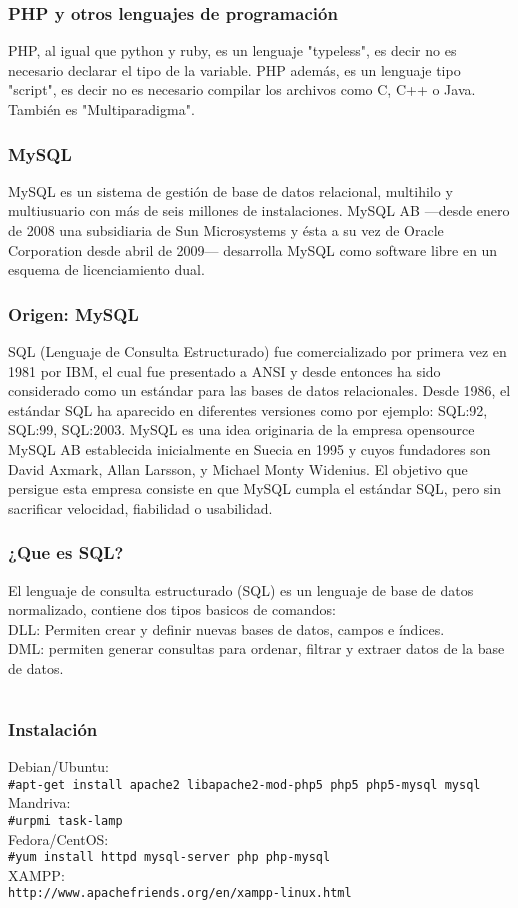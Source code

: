 \documentclass[]{beamer}
\begin{document}
\begin{frame}\frametitle{PHP y otros lenguajes de programación}
PHP, al igual que python y ruby, es un lenguaje "typeless", es decir no es necesario
declarar el tipo de la variable.
PHP además, es un lenguaje tipo "script", es decir no es necesario compilar los archivos como C, C++ o Java.
También es "Multiparadigma". 
\end{frame}

\begin{frame}\frametitle{MySQL}
MySQL es un sistema de gestión de base de datos relacional, multihilo y multiusuario  con más de seis millones de instalaciones. MySQL AB —desde enero de 2008 una subsidiaria de Sun Microsystems y ésta a su vez de Oracle Corporation desde abril de 2009— desarrolla MySQL como software libre en un esquema de licenciamiento dual.
\end{frame}

\begin{frame}\frametitle{Origen: MySQL}
SQL (Lenguaje de Consulta Estructurado) fue comercializado por primera vez en 1981 por IBM, el cual fue presentado a ANSI y desde entonces ha sido considerado como un estándar para las bases de datos relacionales. Desde 1986, el estándar SQL ha aparecido en diferentes versiones como por ejemplo: SQL:92, SQL:99, SQL:2003. MySQL es una idea originaria de la empresa opensource MySQL AB  establecida inicialmente en Suecia en 1995 y cuyos fundadores son David Axmark, Allan Larsson, y Michael Monty Widenius. El objetivo que persigue esta empresa consiste en que MySQL cumpla el estándar SQL, pero sin sacrificar velocidad, fiabilidad o usabilidad.
\end{frame}

\begin{frame}\frametitle{¿Que es SQL?}
El lenguaje de consulta estructurado (SQL) es un lenguaje de base de datos normalizado, contiene dos tipos basicos de comandos: \\
DLL: Permiten crear y definir nuevas bases de datos, campos e índices. \\
DML: permiten generar consultas para ordenar, filtrar y extraer datos de la base de datos. \\
\end{frame}

\section[Instalación]{}
\begin{frame}\frametitle{Instalación}
Debian/Ubuntu: \\
\texttt{#apt-get install apache2 libapache2-mod-php5 php5 php5-mysql mysql} \\ 
Mandriva: \\ 
\texttt{#urpmi task-lamp} \\ 
Fedora/CentOS: \\ 
\texttt{#yum install httpd mysql-server php php-mysql} \\ 
XAMPP: \\
\texttt{http://www.apachefriends.org/en/xampp-linux.html} \\
\end{frame}
\end{document}
